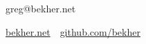
\title{\CVAuthor}

\begin{subtitle}
greg@bekher.net

\par
\href{\CVWebpage}
{bekher.net}
\,\SubBulletSymbol\,
\href{https://github.com/bekher}
{github.com/bekher}
\end{subtitle}